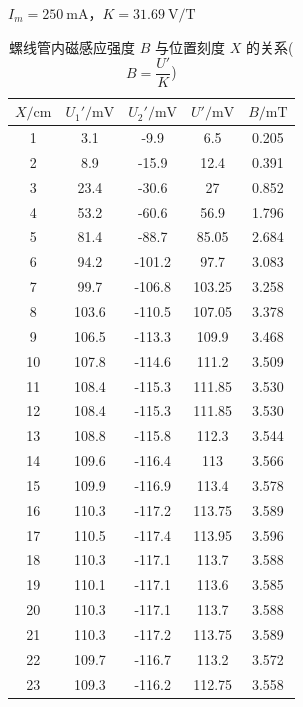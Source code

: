 \documentclass[12pt]{article}
\begin{document}
\begin{table}[H]
    \centering 
    \caption{螺线管内磁感应强度 $B$ 与位置刻度 $X$ 的关系($B=\dfrac{U'}{K}$)} 
    \begin{minipage}{0.7\textwidth} 
        \raggedleft $I_m=250\ \mathrm{mA}$，$K=31.69\ \mathrm{V/T}$ 
    \end{minipage} 
    \small
    \begin{tabular*}{0.7\textwidth}{@{\extracolsep{\fill}}ccccc}
        \hline\hline 
        $X/\mathrm{cm}$ & $U_1'/\mathrm{mV}$ & $U_2'/\mathrm{mV}$ & $U'/\mathrm{mV}$ & $B/\mathrm{mT}$ \\ 
        \hline 1 & 3.1 & -9.9 & 6.5 & 0.205 \\
        2 & 8.9 & -15.9 & 12.4 & 0.391 \\ 
        3 & 23.4 & -30.6 & 27 & 0.852 \\ 
        4 & 53.2 & -60.6 & 56.9 & 1.796 \\ 
        5 & 81.4 & -88.7 & 85.05 & 2.684 \\ 
        6 & 94.2 & -101.2 & 97.7 & 3.083 \\ 
        7 & 99.7 & -106.8 & 103.25 & 3.258 \\ 
        8 & 103.6 & -110.5 & 107.05 & 3.378 \\ 
        9 & 106.5 & -113.3 & 109.9 & 3.468 \\ 
        10 & 107.8 & -114.6 & 111.2 & 3.509 \\ 
        11 & 108.4 & -115.3 & 111.85 & 3.530 \\ 
        12 & 108.4 & -115.3 & 111.85 & 3.530 \\ 
        13 & 108.8 & -115.8 & 112.3 & 3.544 \\ 
        14 & 109.6 & -116.4 & 113 & 3.566 \\ 
        15 & 109.9 & -116.9 & 113.4 & 3.578 \\ 
        16 & 110.3 & -117.2 & 113.75 & 3.589 \\ 
        17 & 110.5 & -117.4 & 113.95 & 3.596 \\ 
        18 & 110.3 & -117.1 & 113.7 & 3.588 \\ 
        19 & 110.1 & -117.1 & 113.6 & 3.585 \\ 
        20 & 110.3 & -117.1 & 113.7 & 3.588 \\ 
        21 & 110.3 & -117.2 & 113.75 & 3.589 \\ 
        22 & 109.7 & -116.7 & 113.2 & 3.572 \\ 
        23 & 109.3 & -116.2 & 112.75 & 3.558 \\ 

\end{tabular*}
\end{table}
\end{document}

